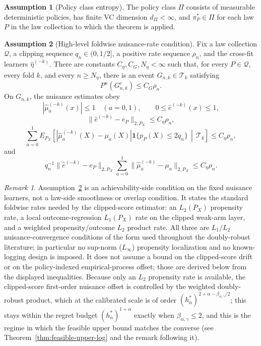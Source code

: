 \documentclass[11pt]{article}
\newcommand{\one}{\mathbf{1}}
\theoremstyle{definition}
\newtheorem{assumption}{Assumption}
\theoremstyle{plain}
\theoremstyle{remark}
\newtheorem{remark}{Remark}
\begin{document}
\begin{assumption}[Policy class entropy]\label{ass:policy-class}
The policy class \(\Pi\) consists of measurable deterministic policies, has
finite VC dimension \(d_\Pi<\infty\), and \(\pi_P^*\in\Pi\) for each law
\(P\) in the law collection to which the theorem is applied.
\end{assumption}

\begin{assumption}[High-level foldwise nuisance-rate condition]\label{ass:nuisance}
Fix a law collection \(\mathcal Q\), a clipping sequence \(q_n\in(0,1/2]\),
a positive rate sequence \(\rho_n\), and the cross-fit learners
\(\widehat\eta^{(-k)}\).  There are constants
\(C_\eta,C_G,N_\eta<\infty\) such that, for every \(P\in\mathcal Q\), every
fold \(k\), and every \(n\ge N_\eta\), there is an event
\(G_{n,k}\in\mathcal T_k\) satisfying
\[
P^n(G_{n,k}^c)\le C_G\rho_n.
\]
On \(G_{n,k}\), the nuisance estimates obey
\[
|\widehat\mu_a^{(-k)}(x)|\le1\quad(a=0,1),\qquad
0\le\widehat e^{(-k)}(x)\le1,
\]
\[
\|\widehat e^{(-k)}-e_P\|_{2,P_X}\le C_\eta\rho_n,
\]
\[
\sum_{a=0}^1
E_{P_X}\!\left[
|\widehat\mu_a^{(-k)}(X)-\mu_a(X)|
\one\{p_P(X)\le2q_n\}
\,\middle|\,\mathcal T_k\right]
\le C_\eta\rho_n,
\]
and
\[
q_n^{-1}
\|\widehat e^{(-k)}-e_P\|_{2,P_X}
\sum_{a=0}^1
\|\widehat\mu_a^{(-k)}-\mu_a\|_{2,P_X}
\le C_\eta\rho_n.
\]
\end{assumption}

\begin{remark}
Assumption~\ref{ass:nuisance} is an achievability-side condition on the
fixed nuisance learners, not a law-side smoothness or overlap condition.  It
states the standard foldwise rates needed by the clipped-score estimator: an
\(L_2(P_X)\) propensity rate, a local outcome-regression \(L_1(P_X)\) rate on
the clipped weak-arm layer, and a weighted propensity/outcome \(L_2\) product
rate.  All three are \(L_1/L_2\) nuisance-convergence conditions of the form
used throughout the doubly-robust literature; in particular no sup-norm
(\(L_\infty\)) propensity localization and no known-logging design is imposed.
It does not assume a bound on the clipped-score drift or on the policy-indexed
empirical-process offset; those are derived below from the displayed
inequalities.  Because only an \(L_2\) propensity rate is available, the
clipped-score first-order nuisance offset is controlled by the weighted
doubly-robust product, which at the calibrated scale is of order
\((h_n^*)^{2+\alpha-\beta_{\alpha,\gamma}/2}\); this stays within the regret
budget \((h_n^*)^{1+\alpha}\) exactly when \(\beta_{\alpha,\gamma}\le2\), and
this is the regime in which the feasible upper bound matches the converse
(see Theorem~\ref{thm:feasible-upper-log} and the remark following it).
\end{remark}
\end{document}
